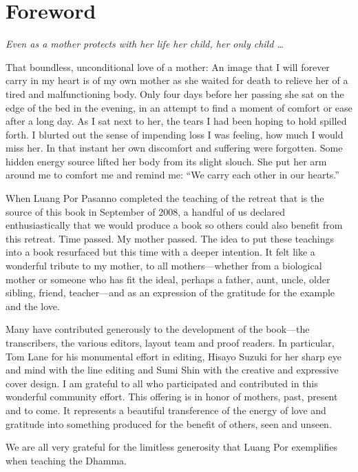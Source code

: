 \chapter{Foreword}

{\center
\emph{Even as a mother protects with her life her child, her only child
\ldots{}}

}

\vspace{1em}\noindent
That boundless, unconditional love of a mother: An image that I will
forever carry in my heart is of my own mother as she waited for death to
relieve her of a tired and malfunctioning body. Only four days before
her passing she sat on the edge of the bed in the evening, in an attempt
to find a moment of comfort or ease after a long day. As I sat next to
her, the tears I had been hoping to hold spilled forth. I blurted out
the sense of impending loss I was feeling, how much I would miss her. In
that instant her own discomfort and suffering were forgotten. Some
hidden energy source lifted her body from its slight slouch. She put her
arm around me to comfort me and remind me: “We carry each other in our
hearts.”

When Luang Por Pasanno completed the teaching of the retreat that is the
source of this book in September of 2008, a handful of us declared
enthusiastically that we would produce a book so others could also
benefit from this retreat. Time passed. My mother passed. The idea to
put these teachings into a book resurfaced but this time with a deeper
intention. It felt like a wonderful tribute to my mother, to all
mothers—whether from a biological mother or someone who has fit the
ideal, perhaps a father, aunt, uncle, older sibling, friend, teacher—and
as an expression of the gratitude for the example and the love.

Many have contributed generously to the development of the book—the
transcribers, the various editors, layout team and proof readers. In
particular, Tom Lane for his monumental effort in editing, Hisayo Suzuki
for her sharp eye and mind with the line editing and Sumi Shin with the
creative and expressive cover design. I am grateful to all who
participated and contributed in this wonderful community effort. This
offering is in honor of mothers, past, present and to come. It
represents a beautiful transference of the energy of love and gratitude
into something produced for the benefit of others, seen and unseen.

We are all very grateful for the limitless generosity that Luang Por
exemplifies when teaching the Dhamma.
